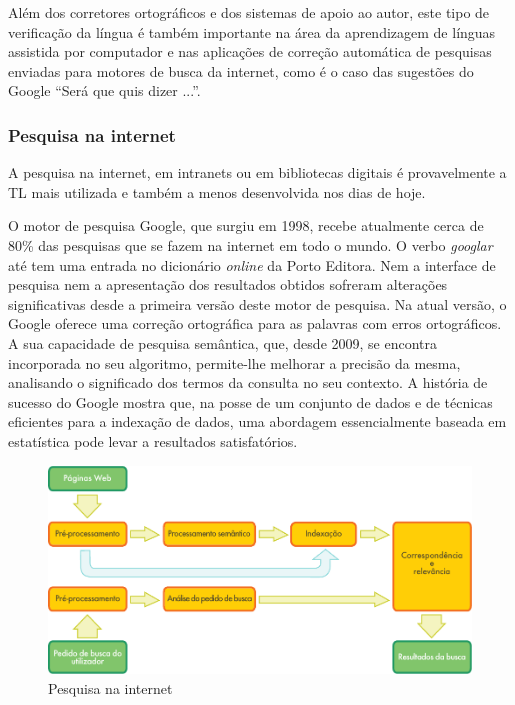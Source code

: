 \begin{multicols}{2}
Além dos corretores ortográficos e dos sistemas de apoio ao autor, este tipo de verificação da língua é também importante na área da aprendizagem de línguas assistida por computador e nas aplicações de correção automática de pesquisas enviadas para motores de busca da internet, como é o caso das sugestões do Google “Será que quis dizer ...”.

\subsubsection{Pesquisa na internet}

 A pesquisa na internet, em intranets ou em bibliotecas digitais é provavelmente a TL mais utilizada e também a menos desenvolvida nos dias de hoje.

O motor de pesquisa Google, que surgiu em 1998, recebe atualmente cerca de 80\% das pesquisas que se fazem na internet em todo o mundo\cite{spi1}. O verbo \textit{googlar} até tem uma entrada no dicionário \textit{online} da Porto Editora. Nem a interface de pesquisa nem a apresentação dos resultados obtidos sofreram alterações significativas desde a primeira versão deste motor de pesquisa. Na atual versão, o Google o\-fe\-re\-ce uma correção ortográfica para as palavras com erros ortográficos. A sua capacidade de pesquisa semântica, que, desde 2009, se encontra incorporada no seu algoritmo, permite-lhe melhorar a precisão da mesma, analisando o significado dos termos da consulta no seu contexto\cite{pc1}. A história de sucesso do Google mostra que, na posse de um conjunto de dados e de técnicas eficientes para a indexação de dados, uma abordagem essencialmente baseada em estatística pode levar a resultados satisfatórios.

\begin{figure}[htb]
  \center
  \includegraphics[width=\textwidth]{../_media/portuguese/web_search_architecture}
  \caption{Pesquisa na internet}
  \label{fig:websearcharch_de}
\end{figure}


\end{multicols}
